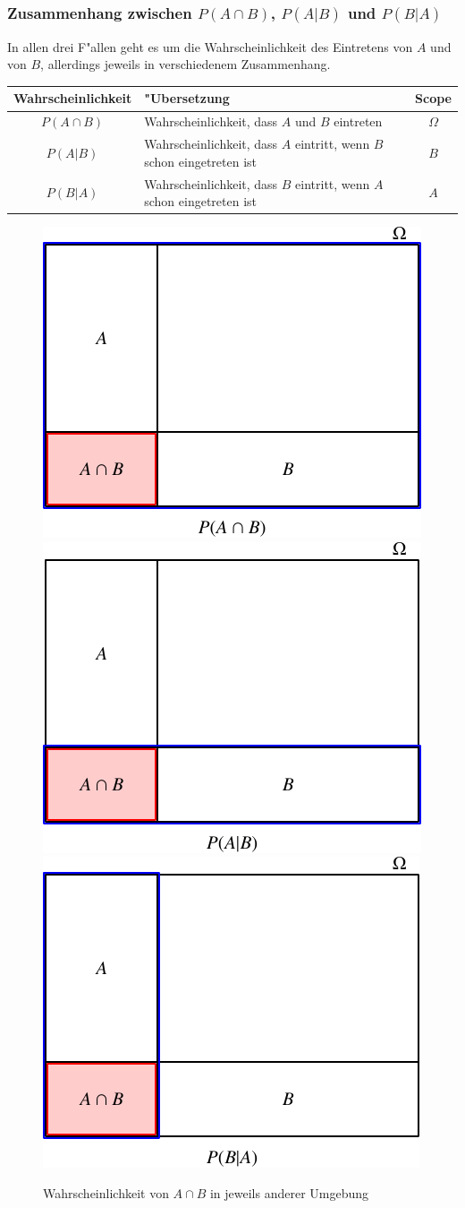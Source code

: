\subsubsection{Zusammenhang zwischen $P(A\cap B)$, $P(A|B)$ und $P(B|A)$}
In allen drei F"allen geht es um die Wahrscheinlichkeit des Eintretens
von $A$ und von $B$, allerdings jeweils in verschiedenem
Zusammenhang.
\begin{center}
\begin{tabular}{|c|l|c|}
\hline
Wahrscheinlichkeit&"Ubersetzung&Scope\\
\hline
$P(A\cap B)$&\strut Wahrscheinlichkeit, dass $A$ und $B$ eintreten\strut &$\Omega$\\
$P(A|B)$&\begin{minipage}[t]{3.0in}\strut Wahrscheinlichkeit, dass $A$ eintritt, wenn $B$ schon eingetreten ist\strut \end{minipage}&$B$\\
$P(B|A)$&\begin{minipage}[t]{3.0in}\strut Wahrscheinlichkeit, dass $B$ eintritt, wenn $A$ schon eingetreten ist\strut \end{minipage}&$A$\\
\hline
\end{tabular}
\end{center}
\begin{figure}
\begin{center}
\includegraphics[width=0.3\hsize]{images/abhaengigkeit-3}\quad
\includegraphics[width=0.3\hsize]{images/abhaengigkeit-5}\quad
\includegraphics[width=0.3\hsize]{images/abhaengigkeit-4}
\end{center}
\caption{Wahrscheinlichkeit von $A\cap B$ in jeweils anderer Umgebung
\label{condprob}}
\end{figure}

